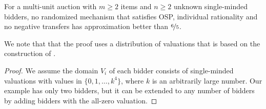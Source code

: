 

\begin{theorem}\label{thm-mua-sm-lb}
For a multi-unit auction with $m\ge 2$ items and $n \ge 2$ unknown single-minded bidders,
no randomized mechanism that satisfies OSP, individual rationality and no negative transfers has approximation better than $\nicefrac{6}{5}$.
\end{theorem}
We note that that the proof uses a distribution of valuations that is based on the 
construction of \cite{Ron24}.  
\begin{proof}
We assume the domain $V_i$ of each bidder consists of single-minded valuations with values in  $\{0,1,\ldots,k^4\}$, where $k$ is an arbitrarily large number. 
Our example has only two bidders,  but it can be  extended to any number of bidders by adding bidders with the all-zero valuation. 


\end{proof}
